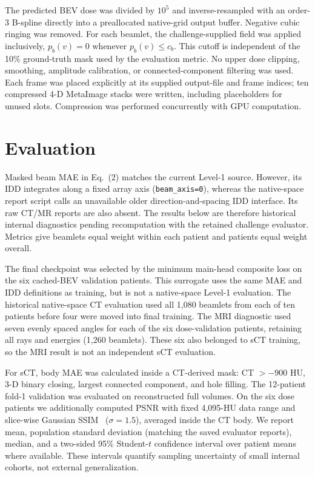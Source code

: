 \documentclass[runningheads]{llncs}
\begin{document}
The predicted BEV dose was divided by $10^5$ and inverse-resampled with an
order-3 B-spline directly into a preallocated native-grid output buffer.
Negative cubic ringing was removed. For each beamlet, the challenge-supplied
 field was applied inclusively,
$p_b(v)=0$ whenever $p_b(v)\leq c_b$. This cutoff is independent of the 10\%
ground-truth mask used by the evaluation metric. No upper dose clipping,
smoothing, amplitude calibration, or connected-component filtering was used.
Each frame was placed explicitly at its supplied output-file and frame indices;
ten compressed 4-D MetaImage stacks were written, including placeholders for
unused slots. Compression was performed concurrently with GPU computation.

\section{Evaluation}

Masked beam MAE in Eq.~(2) matches the current Level-1 source. However, its IDD
integrates along a fixed array axis (\texttt{beam\_axis=0}), whereas the
native-space report script calls an unavailable older direction-and-spacing
IDD interface. Its raw CT/MR reports are also absent. The results below are
therefore historical internal diagnostics pending recomputation with the
retained challenge evaluator. Metrics give beamlets equal weight within each
patient and patients equal weight overall.

The final checkpoint was selected by the minimum main-head composite loss on
the six cached-BEV validation patients. This surrogate uses the same MAE and
IDD definitions as training, but is not a native-space Level-1 evaluation.
The historical native-space CT evaluation used all 1,080 beamlets from each of
ten patients before four were moved into final training. The MRI diagnostic
used seven evenly spaced angles for each of the six dose-validation patients,
retaining all rays and energies (1,260 beamlets). These six also belonged to
sCT training, so the MRI result is not an independent sCT evaluation.

For sCT, body MAE was calculated inside a CT-derived mask: CT $>-900$ HU,
3-D binary closing, largest connected component, and hole filling. The
12-patient fold-1 validation was evaluated on reconstructed full volumes. On
the six dose patients we additionally computed PSNR with fixed 4,095-HU data
range and slice-wise Gaussian SSIM~\cite{wang2004ssim} ($\sigma=1.5$), averaged
inside the CT body. We report mean, population standard deviation (matching the
saved evaluator reports), median, and a two-sided 95\% Student-$t$ confidence
interval over patient means where available. These intervals quantify sampling
uncertainty of small internal cohorts, not external generalization.
\end{document}
